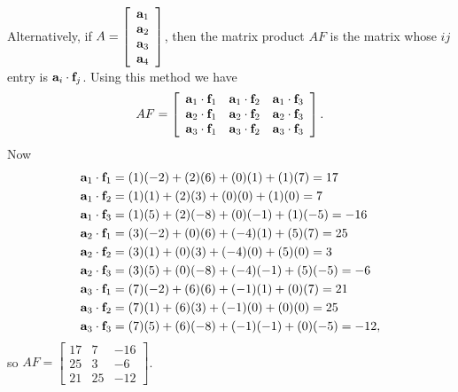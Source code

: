 \begin{example}
Alternatively, if $A = \left[ \begin{array}{c} \mathbf{a}_1\\ \mathbf{a}_2 \\ \mathbf{a}_3 \\ \mathbf{a}_4 \end{array}\right]$, then the matrix product $AF$ is the matrix whose $ij$ entry is $\mathbf{a}_i \cdot \mathbf{f}_j$. Using this method we have 
\[AF = \left[ \begin{array}{ccc} \mathbf{a}_1 \cdot \mathbf{f}_1&\mathbf{a}_1 \cdot \mathbf{f}_2 & \mathbf{a}_1 \cdot \mathbf{f}_3 \\ \mathbf{a}_2 \cdot \mathbf{f}_1&\mathbf{a}_2 \cdot \mathbf{f}_2 & \mathbf{a}_2 \cdot \mathbf{f}_3 \\ \mathbf{a}_3 \cdot \mathbf{f}_1&\mathbf{a}_3 \cdot \mathbf{f}_2 & \mathbf{a}_3 \cdot \mathbf{f}_3 \end{array} \right].\]
Now 
\begin{align*}
\mathbf{a}_1 \cdot \mathbf{f}_1 &= (1)(-2)+(2)(6)+(0)(1)+(1)(7) = 17 \\ 
\mathbf{a}_1 \cdot \mathbf{f}_2 &= (1)(1)+(2)(3)+(0)(0)+(1)(0) = 7 \\ 
\mathbf{a}_1 \cdot \mathbf{f}_3 &= (1)(5)+(2)(-8)+(0)(-1)+(1)(-5) = -16 \\  
\mathbf{a}_2 \cdot \mathbf{f}_1 &= (3)(-2)+(0)(6)+(-4)(1)+(5)(7) = 25 \\
\mathbf{a}_2 \cdot \mathbf{f}_2 &= (3)(1)+(0)(3)+(-4)(0)+(5)(0) = 3 \\
\mathbf{a}_2 \cdot \mathbf{f}_3 &= (3)(5)+(0)(-8)+(-4)(-1)+(5)(-5) = -6 \\ 
\mathbf{a}_3 \cdot \mathbf{f}_1 &= (7)(-2)+(6)(6)+(-1)(1)+(0)(7) = 21\\
\mathbf{a}_3 \cdot \mathbf{f}_2 &= (7)(1)+(6)(3)+(-1)(0)+(0)(0) = 25 \\
\mathbf{a}_3 \cdot \mathbf{f}_3 &=(7)(5)+(6)(-8)+(-1)(-1)+(0)(-5) = -12,
\end{align*}
so $AF = \left[ \begin{array}{ccr} 17&7&-16\\25&3&-6\\21&25&-12 \end{array} \right]$. 

\end{example}
